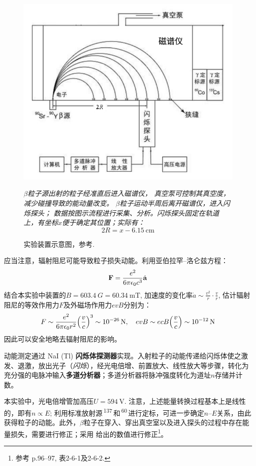 \documentclass[aps,pre,12pt,preprint,%
	onecolumn,showpacs,showkeys,nofootinbib]{revtex4-1}
\newcommand{\CsAtom}{\,\textsuperscript{137}\tup{Cs}\,}
\newcommand{\CoAtom}{\,\textsuperscript{60}\tup{Cs}\,}
\begin{document}
	\begin{figure}[!h]
	\vspace{-3ex}
	\centering
	\includegraphics[width=.6\linewidth]{app+.png}
	\caption[装置]{实验装置示意图，参考\cite{textbook}. 
		\vspace{-.5ex}}
	\raggedright\small
	\textit{\hphantom{说明}
		$\beta$粒子源出射的粒子经准直后进入磁谱仪，
		真空泵可控制其真空度，减少碰撞导致的能动量改变。
		$\beta$粒子运动半周后离开磁谱仪，进入闪烁探头；
		数据按图示流程进行采集、分析。闪烁探头固定在轨道上，有坐标$x$便于确定其位置；实际有：\vspace{-1.2ex}
		\[2R = x - \SI{6.15}{\cm}\]}
	\vspace{-2ex}
	\label{fig:app}
	\end{figure}
	
	应当注意，辐射阻尼可能导致粒子损失动能。利用亚伯拉罕--洛仑兹方程：
	\begin{equation}
		\vb{F} = \frac{e^2}{6\pi\epsilon_0 c^3} \dot{\vb{a}}
	\end{equation}
	结合本实验中装置的$B = \SI{603.4}{G} = \SI{60.34}{\milli\tesla}$, 加速度的变化率$\dot{a} \sim \frac{v^2}{r} \cdot \frac{v}{r}$, 估计辐射阻尼的等效作用力$F$及外磁场作用力$evB$分别为：
	\begin{equation}
		F \sim \frac{e^2}{6\pi\epsilon_0 r^2}
			\pqty{\frac{v}{c}}^3
			\sim \SI{e-26}{\N},\quad
		evB \sim ecB \pqty{\frac{v}{c}}
			\sim \SI{e-12}{\N}
	\end{equation}
	因此可以安全地略去辐射阻尼的影响。
	
	动能测定通过 NaI (Tl) \textbf{闪烁体探测器}实现。入射粒子的动能传递给闪烁体使之激发、退激，放出光子（\textit{闪烁}），经光电倍增、前置放大、线性放大等步骤，转化为充分强的电脉冲输入\textbf{多道分析器}；多道分析器将脉冲强度转化为道址$n$存储并计数。
	
	本实验中，光电倍增管加高压$U = \SI{594}{\V}$. 注意，上述能量转换过程基本上是线性的，即有$n\propto E$; 利用标准放射源\CsAtom 和\CoAtom 进行定标，可进一步确定$n$--$E$关系，由此获得粒子的动能。此外，$\beta$粒子在穿入、穿出真空室以及进入探头的过程中存在能量损失，需要进行修正；采用 \cite{textbook} 给出的数值进行修正\footnote{%
		参考\cite{textbook} p.\numrange{96}{97}, 表2-6-1及2-6-2. }。
\end{document}
